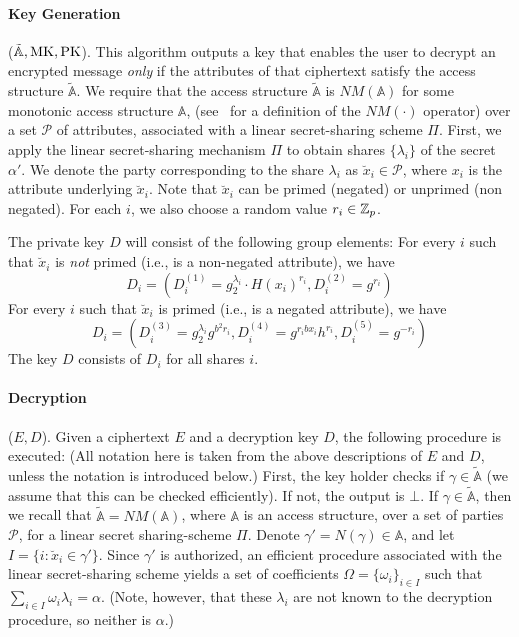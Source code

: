 \documentclass[a4paper, 11pt]{article}
\theoremstyle{definition}
\newcommand{\PK}{\ensuremath{\textrm{PK}}}
\begin{document}
\paragraph{Key Generation} ($\mathbb{\tilde{A}},\MK,\PK$).
This
algorithm outputs a key that enables the user to decrypt an encrypted message \emph{only}
 if the attributes of that ciphertext
satisfy the access structure $\mathbb{\tilde{A}}$.  We require that the
access structure $\mathbb{\tilde{A}}$ is $NM(\mathbb{A})$ for some monotonic access structure $\mathbb{A}$, (see~\cite{OSW07} for a definition of the $NM(\cdot)$ operator)
over a set $\mathcal{P}$ of attributes, associated with a linear secret-sharing scheme $\Pi$.
First, we apply the linear secret-sharing mechanism $\Pi$ to obtain shares $\{\lambda_i\}$ of the
secret $\alpha'$.  We denote the
party corresponding to the share $\lambda_i$ as $\breve{x}_i \in \mathcal{P}$,
where $x_i$
is the attribute underlying $\breve{x}_i$.  Note that $\breve{x}_i$
can be primed (negated) or unprimed (non negated).
For each $i$, we also choose a random value $r_i\in\mathbb{Z}_p$.

The private key $D$ will consist of the following group elements:
For every $i$ such that $\breve{x}_i$ is \emph{not} primed (i.e., is a non-negated
attribute), we have $$D_i =
(D^{(1)}_i = g_2^{\lambda_i} \cdot H(x_i)^{r_i},
D^{(2)}_i = g^{r_i})$$
For every $i$ such that $\breve{x}_i$ is primed (i.e., is a negated attribute), we have
$$D_i = (
D^{(3)}_i = g_2^{\lambda_i}g^{b^2r_i},
D^{(4)}_i = g^{r_ibx_i}h^{r_i},
D^{(5)}_i = g^{-r_i})$$  The key $D$ consists of $D_i$ for all shares $i$.


\paragraph{Decryption} ($E,D$).
Given a ciphertext $E$ and a decryption key $D$, the following procedure is executed:
 (All notation here is taken from the above descriptions of $E$ and $D$, unless the
notation is introduced below.)
First, the key holder checks if $\gamma \in \mathbb{\tilde{A}}$ (we assume that
 this can be checked efficiently).
If not, the output is $\bot$.
If $\gamma \in \mathbb{\tilde{A}}$, then we recall that $\mathbb{\tilde{A}} = NM(\mathbb{A})$,
where $\mathbb{A}$ is an access structure, over a
set of parties $\mathcal{P}$, for a
linear secret sharing-scheme $\Pi$.
Denote $\gamma' = N(\gamma) \in \mathbb{A}$,
and let $I = \{i: \breve{x}_i \in \gamma' \}$.
Since $\gamma'$ is authorized, an efficient procedure associated with the
linear secret-sharing scheme yields a set of coefficients
$\Omega = \{\omega_i\}_{i \in I}$ such that
$\sum_{i \in I} \omega_i \lambda_i = \alpha$.
(Note, however, that these $\lambda_i$ are not known to the decryption procedure, so neither is $\alpha$.)
\end{document}
